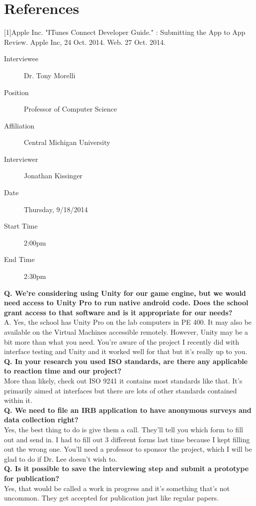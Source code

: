\documentclass[a4wide]{article}
\begin{document}

\newpage
\appendix
\appendixpage

\section{References}
[1]Apple Inc. "ITunes Connect Developer Guide." : Submitting the App to App Review. Apple Inc, 24 Oct. 2014. Web. 27 Oct. 2014.

\begin{description}
\item[Interviewee] Dr. Tony Morelli
\item[Position] Professor of Computer Science
\item[Affiliation] Central Michigan University
\item[Interviewer] Jonathan Kissinger
\item[Date] Thursday, 9/18/2014
\item[Start Time] 2:00pm
\item[End Time] 2:30pm
\end{description}
\textbf{Q. We're considering using Unity for our game engine, but we would need
access to Unity Pro to run native android code.  Does the school grant access to
that software and is it appropriate for our needs?}\\
A. Yes, the school has Unity Pro on the lab computers in PE 400.  It may also be
available on the Virtual Machines accessible remotely.  However, Unity may be a
bit more than what you need.  You're aware of the project I recently did with
interface testing and Unity and it worked well for that but it's really up to
you.\vspace{2.0 mm}\\
\textbf{Q. In your research you used ISO standards, are there any applicable to
reaction time and our project?}\\
More than likely, check out ISO 9241 it contains most standards like that.  It's
primarily aimed at interfaces but there are lots of other standards contained
within it.\vspace{2.0 mm}\\
\textbf{Q. We need to file an IRB application to have anonymous surveys and data
collection right?}\\
Yes, the best thing to do is give them a call.  They'll tell you which form to
fill out and send in.  I had to fill out 3 different forms last time because I
kept filling out the wrong one.  You'll need a professor to sponsor the project,
which I will be glad to do if Dr. Lee doesn't wish to.\vspace{2.0 mm}\\
\textbf{Q. Is it possible to save the interviewing step and submit a prototype
for publication?}\\
Yes, that would be called a work in progress and it's something that's not
uncommon.  They get accepted for publication just like regular papers.
\end{document}
